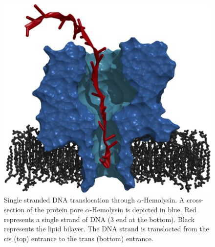 \documentclass[a4paper,10pt]{article}
\begin{document}

\begin{figure}
\begin{center}
\includegraphics[scale=0.5]{pore_dna-1.jpg}
\end{center}
\caption{Single stranded DNA translocation through $\alpha$-Hemolysin. A cross-section of the protein 
pore $\alpha$-Hemolysin is depicted in blue. Red represents a single strand of DNA (3 end at the bottom).  
Black represents the lipid bilayer.  The DNA strand is translocted from the cis (top) entrance to the trans 
(bottom) entrance.}
\label{}
\end{figure}
\end{document}
